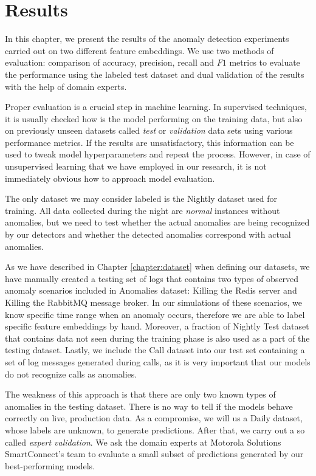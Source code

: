 \chapter{Results}
\label{results}

In this chapter, we present the results of the anomaly detection experiments carried out on two different feature embeddings. We use two methods of evaluation: comparison of accuracy, precision, recall and $F1$ metrics to evaluate the performance using the labeled test dataset and dual validation of the results with the help of domain experts.


Proper evaluation is a crucial step in machine learning. In supervised techniques, it is usually checked how is the model performing on the training data, but also on previously unseen datasets called \textit{test} or \textit{validation} data sets using various performance metrics. If the results are unsatisfactory, this information can be used to tweak model hyperparameters and repeat the process. However, in case of unsupervised learning that we have employed in our research, it is not immediately obvious how to approach model evaluation. 

The only dataset we may consider labeled is the Nightly dataset used for training. All data collected during the night are \textit{normal} instances without anomalies, but we need to test whether the actual anomalies are being recognized by our detectors and whether the detected anomalies correspond with actual anomalies. 

As we have described in Chapter \ref{chapter:dataset} when defining our datasets, we have manually created a testing set of logs that contains two types of observed anomaly scenarios included in Anomalies dataset: Killing the Redis server and Killing the RabbitMQ message broker. In our simulations of these scenarios, we know specific time range when an anomaly occurs, therefore we are able to label specific feature embeddings by hand. Moreover, a fraction of Nightly Test dataset that contains data not seen during the training phase is also used as a part of the testing dataset. Lastly, we include the Call dataset into our test set containing a set of log messages generated during calls, as it is very important that our models do not recognize calls as anomalies.

The weakness of this approach is that there are only two known types of anomalies in the testing dataset. There is no way to tell if the models behave correctly on live, production data. As a compromise, we will us a Daily dataset, whose labels are unknown, to generate predictions. After that, we carry out a so called \textit{expert validation}. We ask the domain experts at Motorola Solutions SmartConnect's team to evaluate a small subset of predictions generated by our best-performing models. 


